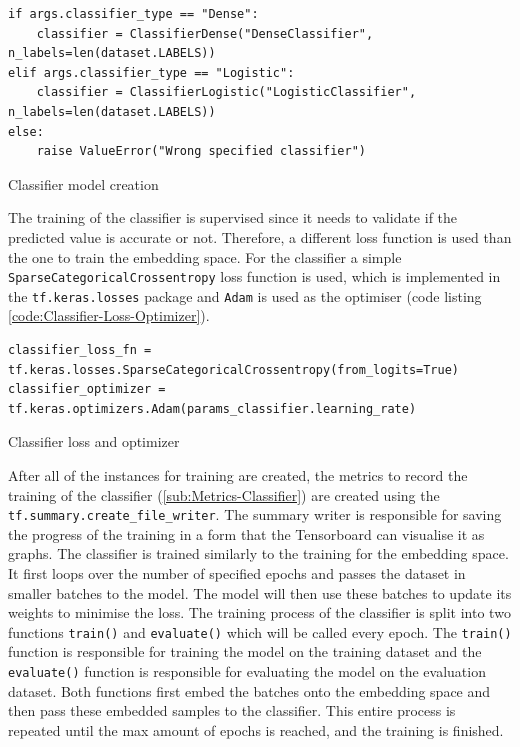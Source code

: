 \begin{code}[H]
\begin{verbatim}
if args.classifier_type == "Dense":
    classifier = ClassifierDense("DenseClassifier", n_labels=len(dataset.LABELS))
elif args.classifier_type == "Logistic":
    classifier = ClassifierLogistic("LogisticClassifier", n_labels=len(dataset.LABELS))
else:
    raise ValueError("Wrong specified classifier")
\end{verbatim}
\caption{Classifier model creation}
\label{code:Classifier-Model-Creation}
\end{code}
\noindent
The training of the classifier is supervised since it needs to validate if the predicted value is accurate or not. Therefore, a different loss function is used than the one to train the embedding space. For the classifier a simple \texttt{SparseCategoricalCrossentropy} loss function is used, which is implemented in the \texttt{tf.keras.losses} package and \texttt{Adam} is used as the optimiser (code listing \ref{code:Classifier-Loss-Optimizer}).

\begin{code}[H]
\begin{verbatim}
classifier_loss_fn = tf.keras.losses.SparseCategoricalCrossentropy(from_logits=True)
classifier_optimizer = tf.keras.optimizers.Adam(params_classifier.learning_rate)
\end{verbatim}
\caption{Classifier loss and optimizer}
\label{code:Classifier-Loss-Optimizer}
\end{code}
\noindent
After all of the instances for training are created, the metrics to record the training of the classifier (\ref{sub:Metrics-Classifier}) are created using the \texttt{tf.summary.create\_file\_writer}. The summary writer is responsible for saving the progress of the training in a form that the Tensorboard can visualise it as graphs. 
\newline
\newline
The classifier is trained similarly to the training for the embedding space. It first loops over the number of specified epochs and passes the dataset in smaller batches to the model. The model will then use these batches to update its weights to minimise the loss. The training process of the classifier is split into two functions \texttt{train()} and \texttt{evaluate()} which will be called every epoch. The \texttt{train()} function is responsible for training the model on the training dataset and the \texttt{evaluate()} function is responsible for evaluating the model on the evaluation dataset. Both functions first embed the batches onto the embedding space and then pass these embedded samples to the classifier. This entire process is repeated until the max amount of epochs is reached, and the training is finished.


